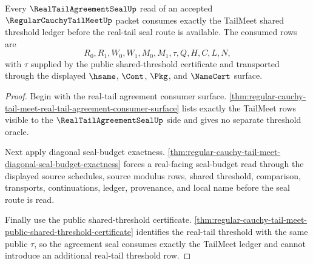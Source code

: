 \begin{theorem}
\label{thm:regular-cauchy-tail-meet-real-tail-threshold-ledger}
Every $\RealTailAgreementSealUp$ read of an accepted $\RegularCauchyTailMeetUp$ packet consumes exactly the TailMeet shared threshold ledger before the real-tail seal route is available. The consumed rows are
$$
R_0,R_1,W_0,W_1,M_0,M_1,\tau,Q,H,C,L,N,
$$
with $\tau$ supplied by the public shared-threshold certificate and transported through the displayed $\hsame$, $\Cont$, $\Pkg$, and $\NameCert$ surface.
\end{theorem}
\begin{proof}
Begin with the real-tail agreement consumer surface. \autoref{thm:regular-cauchy-tail-meet-real-tail-agreement-consumer-surface} lists exactly the TailMeet rows visible to the $\RealTailAgreementSealUp$ side and gives no separate threshold oracle.

Next apply diagonal seal-budget exactness. \autoref{thm:regular-cauchy-tail-meet-diagonal-seal-budget-exactness} forces a real-facing seal-budget read through the displayed source schedules, source modulus rows, shared threshold, comparison, transports, continuations, ledger, provenance, and local name before the seal route is read.

Finally use the public shared-threshold certificate. \autoref{thm:regular-cauchy-tail-meet-public-shared-threshold-certificate} identifies the real-tail threshold with the same public $\tau$, so the agreement seal consumes exactly the TailMeet ledger and cannot introduce an additional real-tail threshold row.
\end{proof}
